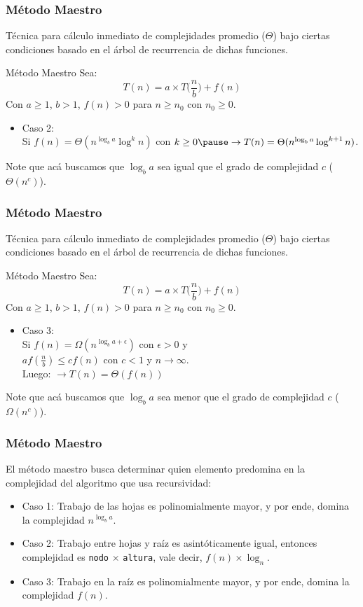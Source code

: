 \documentclass{beamer}
\begin{document}
\begin{frame}[fragile]
 \frametitle{Método Maestro}
\small Técnica para cálculo inmediato de complejidades promedio ($\Theta$) bajo ciertas condiciones basado en el árbol de recurrencia de dichas funciones.

\begin{exampleblock}{Método Maestro}
Sea: 
$$ T(n) = a \times T\Big(\frac{n}{b}\Big) + f(n) $$
Con $a \geq 1$, $b > 1$, $f(n) > 0 $ para $n \geq n_0$ con $n_0 \geq 0$. 
\begin{itemize}
\item Caso 2:\\
\smallskip
Si $f(n) = \Theta(n^{\log_b a} \log^k n)$ con $k \geq 0 \pause \rightarrow T(n) = \Theta(n^{\log_b a} \log^{k+1} n)$.
\end{itemize}
\end{exampleblock}
Note que acá buscamos que $\log_b a$ sea igual que el grado de complejidad $c$ ($\Theta(n^c)$). 
\end{frame}

\begin{frame}[fragile]
 \frametitle{Método Maestro}
\small Técnica para cálculo inmediato de complejidades promedio ($\Theta$) bajo ciertas condiciones basado en el árbol de recurrencia de dichas funciones.

\begin{alertblock}{Método Maestro}
Sea: 
$$ T(n) = a \times T\Big(\frac{n}{b}\Big) + f(n) $$
Con $a \geq 1$, $b > 1$, $f(n) > 0 $ para $n \geq n_0$ con $n_0 \geq 0$. 
\begin{itemize}
\item Caso 3:\\
\smallskip
Si $f(n) = \Omega(n^{\log_b a + \epsilon})$ con $\epsilon > 0$ y\\
$a f(\frac{n}{b}) \leq c f(n)$ con $c < 1$ y $n \rightarrow \infty$.\\\pause
Luego: 
$\rightarrow T(n) = \Theta(f(n))$
\end{itemize}
\end{alertblock}
Note que acá buscamos que $\log_b a$ sea menor que el grado de complejidad $c$ ($\Omega(n^c)$).
\end{frame}

\begin{frame}[fragile]
 \frametitle{Método Maestro}
El método maestro busca determinar quien elemento predomina en la complejidad del algoritmo que usa recursividad:
\begin{itemize}
\item Caso 1: Trabajo de las hojas es polinomialmente mayor, y por ende, domina la complejidad $n^{\log_b a}$.
\item Caso 2: Trabajo entre hojas y raíz es asintóticamente igual, entonces complejidad es \texttt{nodo} $\times$ \texttt{altura}, vale decir, $f(n) \times \log_n$.
\item Caso 3: Trabajo en la raíz es polinomialmente mayor, y por ende, domina la complejidad $f(n)$.
\end{itemize}
\end{frame}
\end{document}
